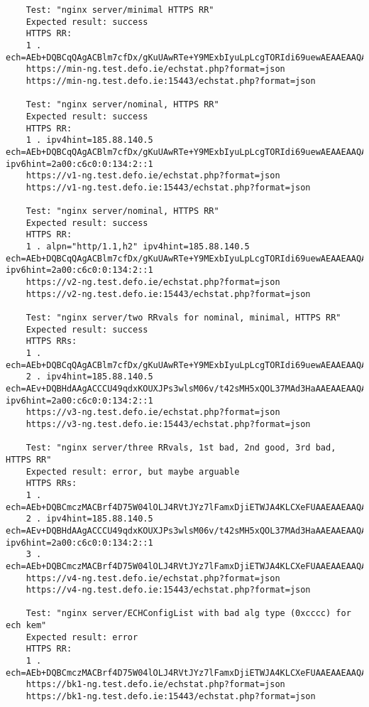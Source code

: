 \tiny
\begin{verbatim}
    Test: "nginx server/minimal HTTPS RR"
    Expected result: success
    HTTPS RR:
    1 . ech=AEb+DQBCqQAgACBlm7cfDx/gKuUAwRTe+Y9MExbIyuLpLcgTORIdi69uewAEAAEAAQATcHVibGljLnRlc3QuZGVmby5pZQAA
    https://min-ng.test.defo.ie/echstat.php?format=json
    https://min-ng.test.defo.ie:15443/echstat.php?format=json

    Test: "nginx server/nominal, HTTPS RR"
    Expected result: success
    HTTPS RR:
    1 . ipv4hint=185.88.140.5 ech=AEb+DQBCqQAgACBlm7cfDx/gKuUAwRTe+Y9MExbIyuLpLcgTORIdi69uewAEAAEAAQATcHVibGljLnRlc3QuZGVmby5pZQAA ipv6hint=2a00:c6c0:0:134:2::1
    https://v1-ng.test.defo.ie/echstat.php?format=json
    https://v1-ng.test.defo.ie:15443/echstat.php?format=json

    Test: "nginx server/nominal, HTTPS RR"
    Expected result: success
    HTTPS RR:
    1 . alpn="http/1.1,h2" ipv4hint=185.88.140.5 ech=AEb+DQBCqQAgACBlm7cfDx/gKuUAwRTe+Y9MExbIyuLpLcgTORIdi69uewAEAAEAAQATcHVibGljLnRlc3QuZGVmby5pZQAA ipv6hint=2a00:c6c0:0:134:2::1
    https://v2-ng.test.defo.ie/echstat.php?format=json
    https://v2-ng.test.defo.ie:15443/echstat.php?format=json

    Test: "nginx server/two RRvals for nominal, minimal, HTTPS RR"
    Expected result: success
    HTTPS RRs:
    1 . ech=AEb+DQBCqQAgACBlm7cfDx/gKuUAwRTe+Y9MExbIyuLpLcgTORIdi69uewAEAAEAAQATcHVibGljLnRlc3QuZGVmby5pZQAA
    2 . ipv4hint=185.88.140.5 ech=AEv+DQBHdAAgACCCU49qdxKOUXJPs3wlsM06v/t42sMH5xQOL37MAd3HaAAEAAEAAQAYb3RoZXJwdWJsaWMudGVzdC5kZWZvLmllAAA= ipv6hint=2a00:c6c0:0:134:2::1
    https://v3-ng.test.defo.ie/echstat.php?format=json
    https://v3-ng.test.defo.ie:15443/echstat.php?format=json

    Test: "nginx server/three RRvals, 1st bad, 2nd good, 3rd bad, HTTPS RR"
    Expected result: error, but maybe arguable
    HTTPS RRs:
    1 . ech=AEb+DQBCmczMACBrf4D75W04lOLJ4RVtJYz7lFamxDjiETWJA4KLCXeFUAAEAAEAAQATcHVibGljLnRlc3QuZGVmby5pZQAA
    2 . ipv4hint=185.88.140.5 ech=AEv+DQBHdAAgACCCU49qdxKOUXJPs3wlsM06v/t42sMH5xQOL37MAd3HaAAEAAEAAQAYb3RoZXJwdWJsaWMudGVzdC5kZWZvLmllAAA= ipv6hint=2a00:c6c0:0:134:2::1
    3 . ech=AEb+DQBCmczMACBrf4D75W04lOLJ4RVtJYz7lFamxDjiETWJA4KLCXeFUAAEAAEAAQATcHVibGljLnRlc3QuZGVmby5pZQAA
    https://v4-ng.test.defo.ie/echstat.php?format=json
    https://v4-ng.test.defo.ie:15443/echstat.php?format=json

    Test: "nginx server/ECHConfigList with bad alg type (0xcccc) for ech kem"
    Expected result: error
    HTTPS RR:
    1 . ech=AEb+DQBCmczMACBrf4D75W04lOLJ4RVtJYz7lFamxDjiETWJA4KLCXeFUAAEAAEAAQATcHVibGljLnRlc3QuZGVmby5pZQAA
    https://bk1-ng.test.defo.ie/echstat.php?format=json
    https://bk1-ng.test.defo.ie:15443/echstat.php?format=json


\end{verbatim}
